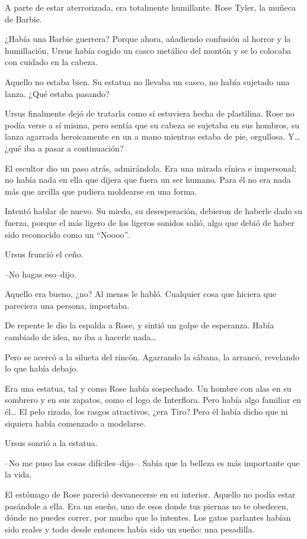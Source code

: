 A parte de estar aterrorizada, era totalmente humillante. Rose Tyler, la
muñeca de Barbie.

¿Había una Barbie guerrera? Porque ahora, añadiendo confusión al horror
y la humillación, Ursus había cogido un casco metálico del montón y se
lo colocaba con cuidado en la cabeza.

Aquello no estaba bien. Su estatua no llevaba un casco, no había
sujetado una lanza. ¿Qué estaba pasando?

Ursus finalmente dejó de tratarla como si estuviera hecha de plastilina.
Rose no podía verse a sí misma, pero sentía que su cabeza se sujetaba en
sus hombros, su lanza agarrada heroicamente en un a mano mientras estaba
de pie, orgullosa. Y\ldots{} ¿qué iba a pasar a continuación?

El escultor dio un paso atrás, admirándola. Era una mirada cínica e
impersonal; no había nada en ella que dijera que fuera un ser humano.
Para él no era nada más que arcilla que pudiera moldearse en una forma.

Intentó hablar de nuevo. Su miedo, su desesperación, debieron de haberle
dado su fuerza, porque el más ligero de los ligeros sonidos salió, algo
que debió de haber sido reconocido como un ``Noooo''.

Ursus frunció el ceño.

--No hagas eso--dijo.

Aquello era bueno, ¿no? Al menos le habló. Cualquier cosa que hiciera
que pareciera una persona, importaba.

De repente le dio la espalda a Rose, y sintió un golpe de esperanza.
Había cambiado de idea, no iba a hacerle nada\ldots{}

Pero se acercó a la silueta del rincón. Agarrando la sábana, la arrancó,
revelando lo que había debajo.

Era una estatua, tal y como Rose había sospechado. Un hombre con alas en
su sombrero y en sus zapatos, como el logo de Interflora. Pero había
algo familiar en él\ldots{} El pelo rizado, los rasgos atractivos, ¿era
Tiro? Pero él había dicho que ni siquiera había comenzado a modelarse.

Ursus sonrió a la estatua.

--No me puso las cosas difíciles--dijo--. Sabía que la belleza es más
importante que la vida.

El estómago de Rose pareció desvanecerse en su interior. Aquello no
podía estar pasándole a ella. Era un sueño, uno de esos donde tus
piernas no te obedecen, dónde no puedes correr, por mucho que lo
intentes. Los gatos parlantes habían sido reales y todo desde entonces
había sido un sueño: una pesadilla.

